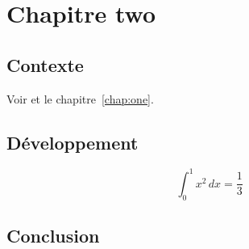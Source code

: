 \chapter{Chapitre two}\label{chap:two}
\section{Contexte}
\lipsum[1-16]
Voir \cite{knuth1984} et le chapitre~\ref{chap:one}.
\section{Développement}
\lipsum[17-32]
\begin{equation}
  \int_0^1 x^2 \, dx = \frac{1}{3}
\end{equation}
\section{Conclusion}
\lipsum[33-48]
